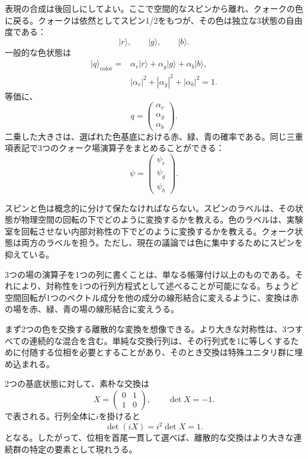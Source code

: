 表現の合成は後回しにしてよい。ここで空間的なスピンから離れ、クォークの色に戻る。クォークは依然としてスピン1/2をもつが、その色は独立な3状態の自由度である：
\begin{equation}
\lvert r\rangle,\qquad
\lvert g\rangle,\qquad
\lvert b\rangle.
\end{equation}
一般的な色状態は
\begin{equation}
\begin{aligned}
\lvert q\rangle_{\mathrm{color}}
={}&
\alpha_r\lvert r\rangle
+\alpha_g\lvert g\rangle
+\alpha_b\lvert b\rangle,
\\
&|\alpha_r|^2+|\alpha_g|^2+|\alpha_b|^2=1.
\end{aligned}
\end{equation}
等価に、
\begin{equation}
q=
\begin{pmatrix}
\alpha_r\\
\alpha_g\\
\alpha_b
\end{pmatrix}.
\end{equation}
二乗した大きさは、選ばれた色基底における赤、緑、青の確率である。同じ三重項表記で3つのクォーク場演算子をまとめることができる：
\begin{equation}
\psi=
\begin{pmatrix}
\psi_r\\
\psi_g\\
\psi_b
\end{pmatrix}.
\end{equation}

スピンと色は概念的に分けて保たなければならない。スピンのラベルは、その状態が物理空間の回転の下でどのように変換するかを教える。色のラベルは、実験室を回転させない内部対称性の下でどのように変換するかを教える。クォーク状態は両方のラベルを担う。ただし、現在の議論では色に集中するためにスピンを抑えている。

3つの場の演算子を1つの列に書くことは、単なる帳簿付け以上のものである。それにより、対称性を1つの行列方程式として述べることが可能になる。ちょうど空間回転が1つのベクトル成分を他の成分の線形結合に変えるように、変換は赤の場を赤、緑、青の場の線形結合に変えうる。

まず2つの色を交換する離散的な変換を想像できる。より大きな対称性は、3つすべての連続的な混合を含む。単純な交換行列は、その行列式を1に等しくするために付随する位相を必要とすることがあり、そのとき交換は特殊ユニタリ群に埋め込まれる。

2つの基底状態に対して、素朴な交換は
\begin{equation}
X=
\begin{pmatrix}0&1\\1&0\end{pmatrix},
\qquad
\det X=-1.
\end{equation}
で表される。行列全体に\(i\)を掛けると
\begin{equation}
\det(iX)=i^2\det X=1.
\end{equation}
となる。したがって、位相を首尾一貫して選べば、離散的な交換はより大きな連続群の特定の要素として現れうる。

